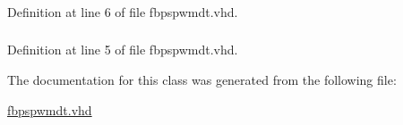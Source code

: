 \subsubsection[{S\+T\+D\+\_\+\+L\+O\+G\+I\+C\+\_\+1164}]{\hspace{0.3cm}{\ttfamily [Package]}}\label{classfbpspwmdt_aa4b2b25246a821511120e3149b003563}


Definition at line 6 of file fbpspwmdt.\+vhd.

\hypertarget{classfbpspwmdt_a241c3e72dd8024cc8ae831b1b2aed7db}{}
\subsubsection[{S\+T\+D\+\_\+\+L\+O\+G\+I\+C\+\_\+\+U\+N\+S\+I\+G\+N\+E\+D}]{\hspace{0.3cm}{\ttfamily [Package]}}\label{classfbpspwmdt_a241c3e72dd8024cc8ae831b1b2aed7db}


Definition at line 5 of file fbpspwmdt.\+vhd.



The documentation for this class was generated from the following file\+:\begin{DoxyCompactItemize}
\item 
\hyperlink{fbpspwmdt_8vhd}{fbpspwmdt.\+vhd}\end{DoxyCompactItemize}
